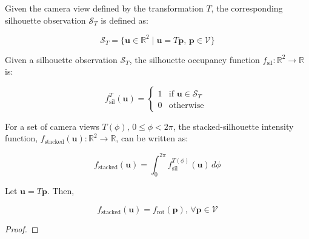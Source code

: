 \begin{definition}
Given the camera view defined by the transformation $T$, the corresponding silhouette observation $\mathcal{S}_T$ is defined as:

    \begin{equation}
        \mathcal{S}_T = \{ \mathbf{u}\in \mathbb{R}^2 \; | \; \mathbf{u}=T\mathbf{p},\, \mathbf{p}\in \mathcal{V} \}
    \end{equation}    
\end{definition}

\begin{definition}
    Given a silhouette observation $\mathcal{S}_T$, the silhouette occupancy function $f_\mathrm{sil}:\mathbb{R}^2 \rightarrow \mathbb{R}$ is:

    \begin{equation}
        f^T_\mathrm{sil}(\mathbf{u}) = \begin{cases}
    1 & \text{if } \mathbf{u} \in \mathcal{S}_T \\
    0   & \text{otherwise }
  \end{cases}
    \end{equation}
\end{definition}

\begin{definition}
For a set of camera views $T(\phi),\,0\leq \phi < 2\pi$, the stacked-silhouette intensity function, $f_\mathrm{stacked}(\mathbf{u}):\mathbb{R}^2 \rightarrow \mathbb{R}$, can be written as:

    \begin{equation}
        f_\mathrm{stacked}(\mathbf{u}) = \int_0^{2\pi} f^{T(\phi)}_\mathrm{sil}(\mathbf{u})\, d\phi
    \end{equation}
\end{definition}

\begin{lemma}
    Let $\mathbf{u}=T\mathbf{p}$. Then,
    
    \begin{equation}
        f_\mathrm{stacked}(\mathbf{u})=f_\mathrm{rot}(\mathbf{p}),\, \forall \mathbf{p} \in \mathcal{V}
    \end{equation}
\end{lemma}

\begin{proof}
    
\end{proof}